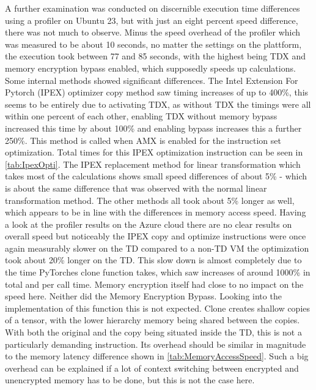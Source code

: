A further examination was conducted on discernible execution time differences using a profiler on Ubuntu 23, but with just an eight percent speed difference, there was not much to observe. Minus the speed overhead of the profiler which was measured to be about 10 seconds, no matter the settings on the plattform, the execution took between 77 and 85 seconds, with the highest being TDX and memory encryption bypass enabled, which supposedly speeds up calculations. Some internal methods showed significant differences. The Intel Extension For Pytorch (IPEX) optimizer copy method saw timing increases of up to 400\%, this seems to be entirely due to activating TDX, as without TDX the timings were all within one percent of each other, enabling TDX without memory bypass increased this time by about 100\% and enabling bypass increases this a further 250\%. This method is called when AMX is enabled for the instruction set optimization. Total times for this IPEX optimization instruction can be seen in \ref{tab:IpexOpti}. The IPEX replacement method for linear transformation which takes most of the calculations shows small speed differences of about 5\% - which is about the same difference that was observed with the normal linear transformation method. The other methods all took about 5\% longer as well, which appears to be in line with the differences in memory access speed.
Having a look at the profiler results on the Azure cloud there are no clear results on overall speed but noticeably the IPEX copy and optimize instructions were once again measurably slower on the TD compared to a non-TD VM the optimization took about 20\% longer on the TD. This slow down is almost completely due to the time PyTorches clone function takes, which saw increases of around 1000\% in total and per call time. Memory encryption itself had close to no impact on the speed here. Neither did the Memory Encryption Bypass. Looking into the implementation of this function this is not expected. Clone creates shallow copies of a tensor, with the lower hierarchy memory being shared between the copies. With both the original and the copy being situated inside the TD, this is not a particularly demanding instruction. Its overhead should be similar in magnitude to the memory latency difference shown in \cref{tab:MemoryAccessSpeed}. Such a big overhead can be explained if a lot of context switching between encrypted and unencrypted memory has to be done, but this is not the case here.
\begin{table}
\centering
{}
\caption{Comparison of different timings of IPEX optimization method}
\label{tab:IpexOpti}
\end{table}


